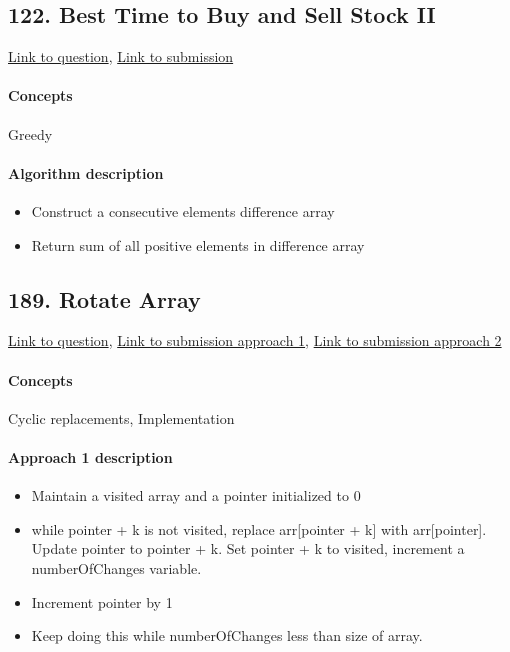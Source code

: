 \documentclass[11pt]{book}
\begin{document}
\subsection{122. Best Time to Buy and Sell Stock II}
\href{https://leetcode.com/problems/best-time-to-buy-and-sell-stock-ii/}{Link to question},
\href{https://leetcode.com/submissions/detail/332894775/}{Link to submission}
\paragraph{Concepts} Greedy

\paragraph{Algorithm description}
\begin{itemize}
    \item Construct a consecutive elements difference array
    \item Return sum of all positive elements in difference array
\end{itemize}

\subsection{189. Rotate Array}
\href{https://leetcode.com/problems/rotate-array/}{Link to question},
\href{https://leetcode.com/submissions/detail/333064713/}{Link to submission approach 1},
\href{https://leetcode.com/submissions/detail/333059899/}{Link to submission approach 2}
\paragraph{Concepts}
Cyclic replacements, Implementation
\paragraph{Approach 1 description}
\begin{itemize}
    \item Maintain a visited array and a pointer initialized to 0
    \item while pointer + k is not visited, replace arr[pointer + k] with arr[pointer]. Update
    pointer to pointer + k. Set pointer + k to visited, increment a numberOfChanges variable.
    \item Increment pointer by 1
    \item Keep doing this while numberOfChanges less than size of array.
\end{itemize}
\end{document}
